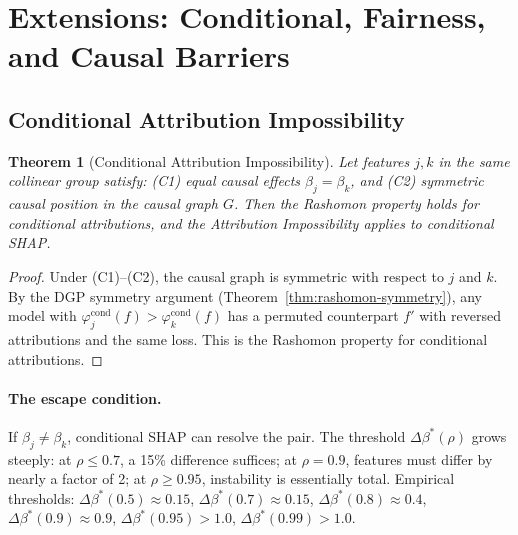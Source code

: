 \documentclass{article}
\newtheorem{theorem}{Theorem}
\begin{document}

\section{Extensions: Conditional, Fairness, and Causal Barriers}
\label{sec:extensions}

\subsection{Conditional Attribution Impossibility}
\label{sec:conditional}

\begin{theorem}[Conditional Attribution Impossibility]
\label{thm:conditional-impossibility}
Let features $j, k$ in the same collinear group satisfy: (C1) equal causal effects $\beta_j = \beta_k$, and (C2) symmetric causal position in the causal graph $G$. Then the Rashomon property holds for conditional attributions, and the Attribution Impossibility applies to conditional SHAP.
\end{theorem}

\begin{proof}
Under (C1)--(C2), the causal graph is symmetric with respect to $j$ and $k$. By the DGP symmetry argument (Theorem~\ref{thm:rashomon-symmetry}), any model with $\varphi_j^{\text{cond}}(f) > \varphi_k^{\text{cond}}(f)$ has a permuted counterpart $f'$ with reversed attributions and the same loss. This is the Rashomon property for conditional attributions.
\end{proof}

\paragraph{The escape condition.}
If $\beta_j \neq \beta_k$, conditional SHAP can resolve the pair. The threshold $\Delta\beta^*(\rho)$ grows steeply: at $\rho \leq 0.7$, a 15\% difference suffices; at $\rho = 0.9$, features must differ by nearly a factor of 2; at $\rho \geq 0.95$, instability is essentially total. Empirical thresholds: $\Delta\beta^*(0.5) \approx 0.15$, $\Delta\beta^*(0.7) \approx 0.15$, $\Delta\beta^*(0.8) \approx 0.4$, $\Delta\beta^*(0.9) \approx 0.9$, $\Delta\beta^*(0.95) > 1.0$, $\Delta\beta^*(0.99) > 1.0$.
\end{document}
